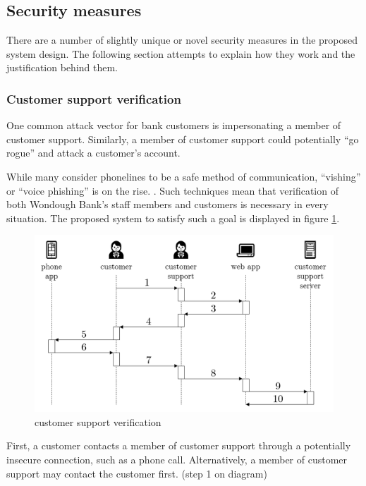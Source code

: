 \subsection{Security measures}

There are a number of slightly unique or novel security measures in the proposed system design. The following section attempts to explain how they work and the justification behind them.

\subsubsection{Customer support verification}

One common attack vector for bank customers is impersonating a member of customer support. Similarly, a member of customer support could potentially ``go rogue'' and attack a customer's account.

While many consider phonelines to be a safe method of communication, ``vishing'' or ``voice phishing'' is on the rise. \cite{bbcPhone} \cite{bbcSmishing} \cite{conArtists}. Such techniques mean that verification of both Wondough Bank's staff members and customers is necessary in every situation. The proposed system to satisfy such a goal is displayed in figure \ref{customerSupport}.

\begin{figure}
    \includegraphics[width=\columnwidth]{images/customer-support}
    \caption{customer support verification}
    \centering
    \label{customerSupport}
\end{figure}

First, a customer contacts a member of customer support through a potentially insecure connection, such as a phone call. Alternatively, a member of customer support may contact the customer first. (step 1 on diagram)


